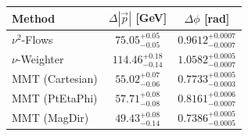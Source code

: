     \begin{tabular}{lcc}
        \toprule
        Method & $\Delta |\vec p|$ [GeV] & $\Delta \phi$ [rad] \\
        \midrule
        $\nu^2$-Flows & $75.05^{+0.05}_{-0.05}$ & $0.9612^{+0.0007}_{-0.0007}$ \\
        $\nu$-Weighter & $114.46^{+0.18}_{-0.14}$ & $1.0582^{+0.0005}_{-0.0007}$ \\
        MMT (Cartesian) & $55.02^{+0.07}_{-0.06}$ & $0.7733^{+0.0005}_{-0.0003}$ \\
        MMT (PtEtaPhi) & $57.71^{+0.08}_{-0.08}$ & $0.8161^{+0.0006}_{-0.0007}$ \\
        MMT (MagDir) & $49.43^{+0.08}_{-0.14}$ & $0.7386^{+0.0005}_{-0.0005}$ \\
        \bottomrule
    \end{tabular}
